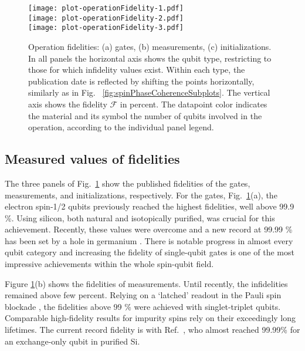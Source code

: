 \documentclass[aps, prx, showpacs, twocolumn, superscriptaddress, notitlepage, longbibliography, floatfix, nofootinbib]{revtex4-2}
\newcommand{\recheck}[1]{{#1}}
\begin{document}
\begin{figure}[ht!]
  \texttt{[image: plot-operationFidelity-1.pdf]} \hfill\\
  \texttt{[image: plot-operationFidelity-2.pdf]} \hfill\\
  \texttt{[image: plot-operationFidelity-3.pdf]} \hfill\\
  \caption{
    \label{fig:operationInfidelities}
  Operation fidelities: (a) gates, (b) measurements, (c) initializations. In all panels the horizontal axis shows the qubit type, restricting to those for which infidelity values exist. Within each type, the publication date is reflected by shifting the points horizontally, similarly as in Fig. ~\ref{fig:spinPhaseCoherenceSubplots}. The vertical axis shows the fidelity $\mathcal{F}$ in percent. The datapoint color indicates the material and its symbol the number of qubits involved in the operation, according to the individual panel legend.
  }
\end{figure}

\subsection{Measured values of fidelities}

The three panels of Fig.~\ref{fig:operationInfidelities} show the published fidelities of the gates, measurements, and initializations, respectively. For the gates, Fig.~\ref{fig:operationInfidelities}(a), \recheck{the electron spin-1/2 qubits previously reached the highest fidelities, well above 99.9 \%. Using silicon, both natural and isotopically purified, was crucial for this achievement. Recently, these values were overcome and a new record at 99.99 \% has been set by a hole in germanium \cite{lawrie_simultaneous_2021}.} \recheck{There is notable progress in almost every qubit category} and increasing the fidelity of single-qubit gates is one of the most impressive achievements within the whole spin-qubit field. 

Figure \ref{fig:operationInfidelities}(b) shows the fidelities of measurements. \recheck{Until recently, the infidelities remained above few percent.} \recheck{Relying on a `latched' readout in the Pauli spin blockade \cite{nakajima_robust_2017,broome_high-fidelity_2017}, the fidelities above 99 \% were achieved with singlet-triplet qubits. Comparable high-fidelity results for impurity spins rely on their exceedingly long lifetimes. The current record fidelity is with Ref.~\cite{blumoff_fast_2021}, who almost reached 99.99\% for an exchange-only qubit in purified Si.}
\end{document}
